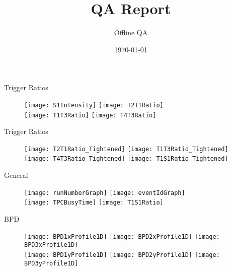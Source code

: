 \documentclass[11pt]{beamer}
\title{QA Report}
\author{Offline QA}
\date{\today}
\begin{document}
  
\begin{frame}
\titlepage
\end{frame}


\begin{frame}{Trigger Ratios}
\begin{figure}
\centering
\texttt{[image: S1Intensity]}
\texttt{[image: T2T1Ratio]} \\
\texttt{[image: T1T3Ratio]}
\texttt{[image: T4T3Ratio]} \\
\end{figure}
\end{frame}

\begin{frame}{Trigger Ratios}
\begin{figure}
\centering
\texttt{[image: T2T1Ratio\_Tightened]} 
\texttt{[image: T1T3Ratio\_Tightened]} \\
\texttt{[image: T4T3Ratio\_Tightened]} 
\texttt{[image: T1S1Ratio\_Tightened]} \\
\end{figure}
\end{frame}

\begin{frame}{General}
\begin{figure}
\centering
\texttt{[image: runNumberGraph]}
\texttt{[image: eventIdGraph]} \\
\texttt{[image: TPCBusyTime]}
\texttt{[image: T1S1Ratio]} \\
\end{figure}
\end{frame}

\begin{frame}{BPD}
\begin{figure}
\centering
\texttt{[image: BPD1xProfile1D]}
\texttt{[image: BPD2xProfile1D]}
\texttt{[image: BPD3xProfile1D]} \\
\texttt{[image: BPD1yProfile1D]}
\texttt{[image: BPD2yProfile1D]}
\texttt{[image: BPD3yProfile1D]} \\
\end{figure}
\end{frame}
\end{document}
